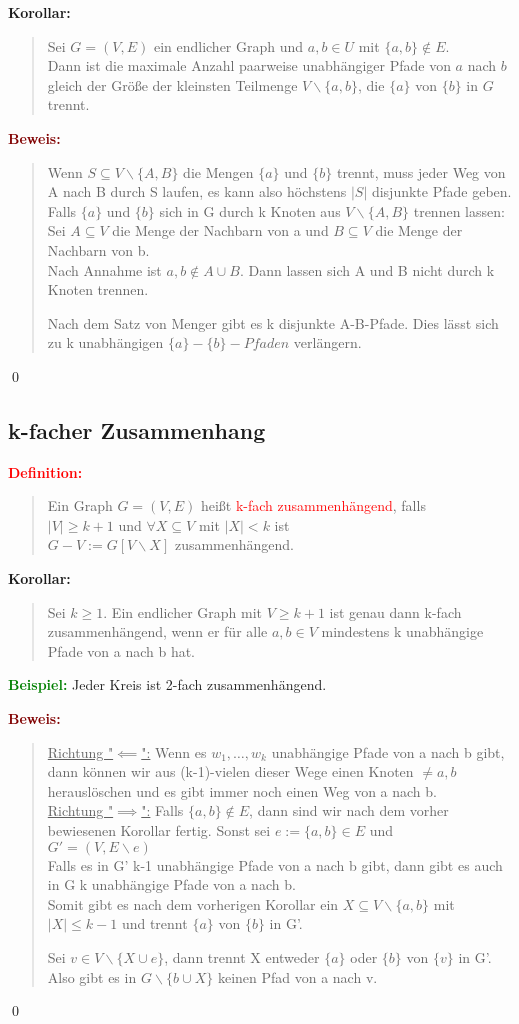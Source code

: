 \documentclass{article}
\newcommand{\red}[1]{\textcolor{red}{#1}}
\newcommand{\green}[1]{\textcolor{green}{#1}}
\newcommand{\dgr}[1]{\textcolor{dgr}{#1}}
\newcommand{\maroon}[1]{\textcolor{maroon}{#1}}
\newcommand{\ex}{\green{\textbf{Beispiel: }}}
\newcommand{\de}[1]{\red{\textbf{Definition: }}\begin{quote}#1\end{quote}}
\newcommand{\co}[1]{\dgr{\textbf{Korollar: }}\begin{quote}#1\end{quote}}
\newcommand{\pr}[1]{\maroon{\textbf{Beweis: }}\begin{quote}#1\end{quote}\qed}
\newcommand{\bs}{\backslash}
\begin{document}
\co{
    Sei $G=(V,E)$ ein endlicher Graph und $a,b \in U$ mit $\{a,b\} \notin E$.\\
    Dann ist die maximale Anzahl paarweise unabhängiger Pfade von $a$ nach $b$ gleich der Größe der kleinsten Teilmenge $V \bs \{a,b\}$, die $\{a\}$ von $\{b\}$ in $G$ trennt.
}

\pr{
    Wenn $S \subseteq V \bs \{A,B\}$ die Mengen $\{a\}$ und $\{b\}$ trennt, muss jeder Weg von A nach B durch S laufen, es kann also höchstens $|S|$ disjunkte Pfade geben.\\
    Falls $\{a\}$ und $\{b\}$ sich in G  durch k Knoten aus $V \bs \{A,B\}$ trennen lassen:\\
    Sei $A \subseteq V$ die Menge der Nachbarn von a und $B \subseteq V$ die Menge der Nachbarn von b.\\
    Nach Annahme ist $a,b \notin A \cup B$. Dann lassen sich A und B nicht durch k Knoten trennen.

    Nach dem Satz von Menger gibt es k disjunkte A-B-Pfade. Dies lässt sich zu k unabhängigen $\{a\}-\{b\}-Pfaden$ verlängern.
}

\newpage
\subsection{k-facher Zusammenhang}

\de{
    Ein Graph $G=(V,E)$ heißt \red{k-fach zusammenhängend}, falls\\
    $|V| \ge k+1$ und $\forall X \subseteq V$ mit $|X| < k$ ist\\
    $G-V := G[V \bs X]$ zusammenhängend.
}

\co{
    Sei $k \ge 1$. Ein endlicher Graph mit $V \ge k+1$ ist genau dann k-fach zusammenhängend, wenn er für alle $a,b \in V$ mindestens k unabhängige Pfade von a nach b hat.
}

\ex Jeder Kreis ist 2-fach zusammenhängend.

\pr{
    \underline{Richtung "$\impliedby$":} Wenn es $w_1, \dots, w_k$ unabhängige Pfade von a nach b gibt, dann können wir aus (k-1)-vielen dieser Wege einen Knoten $\ne a,b$ herauslöschen und es gibt immer noch einen Weg von a nach b.\\
    \underline{Richtung "$\implies$":} Falls $\{a,b\} \notin E$, dann sind wir nach dem vorher bewiesenen Korollar fertig.
    Sonst sei $e:=\{a,b\} \in E$ und\\
    $G' = (V, E \bs e)$\\
    Falls es in G' k-1 unabhängige Pfade von a nach b gibt, dann gibt es auch in G k unabhängige Pfade von a nach b.\\
    Somit gibt es nach dem vorherigen Korollar ein $X \subseteq V \bs \{a,b\}$ mit $|X| \le k-1$ und  trennt $\{a\}$ von $\{b\}$ in G'.

    Sei $v \in V \bs \{X \cup e\}$, dann trennt X entweder $\{a\}$ oder $\{b\}$ von $\{v\}$ in G'.\\
    Also gibt es in $G \bs \{b \cup X\}$ keinen Pfad von a nach v.
}
\end{document}
